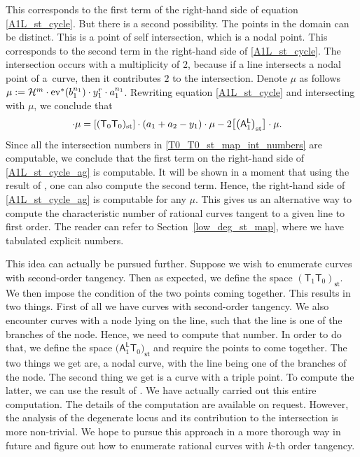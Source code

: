 \documentclass[pdftex]{sigma}
\numberwithin{equation}{section}
\begin{document}
This corresponds to the first term of the right-hand side of equation \eqref{A1L_st_cycle}.
But there is a second possibility. The points in the domain can be distinct. This is a point of self
intersection, which is a nodal point. This corresponds to the second term in the right-hand side of
\eqref{A1L_st_cycle}. The intersection occurs with a multiplicity of $2$, because
if a line intersects a nodal point of a~curve, then it contributes $2$ to the intersection.
Denote $\mu$ as follows
$
\mu := \mathcal{H}^{m}\cdot {\rm ev}^*(b_1^{n_1}) \cdot y_1^r \cdot a_1^{n_1}$.
Rewriting equation \eqref{A1L_st_cycle} and intersecting with $\mu$, we conclude that
\begin{align}
[(\mathsf{T}_1)_{\textsf{st}}]\cdot \mu & =
[(\mathsf{T}_0 \mathsf{T}_0)_{\textnormal{st}} ] \cdot (a_1+a_2-y_1) \cdot \mu-
2 \bigl[\bigl(\mathsf{A}_1^{\mathsf{L}}\bigr)_{\textnormal{st}}\bigr] \cdot \mu. \label{A1L_st_cycle_ag}
\end{align}
Since all the intersection numbers in \eqref{T0_T0_st_map_int_numbers} are computable,
we conclude that
the first term on the right-hand side of \eqref{A1L_st_cycle_ag} is computable.
It will be shown in a moment that using the result of \cite{AiM_m_fold_pt}, one can also compute the second term.
Hence, the right-hand side of \eqref{A1L_st_cycle_ag} is computable for any $\mu$.
This gives us an alternative way to compute the characteristic number of rational curves tangent to a given line to first order.
The reader can refer to Section~\ref{low_deg_st_map}, where we have tabulated explicit numbers.

This idea can actually be pursued further. Suppose we wish to enumerate curves with second-order tangency.
Then as expected, we define the space $(\mathsf{T}_1 \mathsf{T}_0)_{\mathsf{st}}$. We then impose the
condition of the two points coming together. This results in two things. First of all we have curves with second-order tangency. We also encounter curves with a node lying on the line, such that the line is one of the
branches of the node. Hence, we need to compute that number. In order to do that, we define the space
$\bigl(\mathsf{A}_1^{\mathsf{L}} \mathsf{T}_0\bigr)_{\mathsf{st}}$ and require the points to come together. The two things
we get are, a nodal curve, with the line being one of the branches of the node. The second thing we get is a curve
with a triple point. To compute the latter, we can use the result of \cite{AiM_m_fold_pt}. We have
actually carried out this entire computation. The details of the computation are available on request.
However, the analysis of the degenerate locus and its contribution to the intersection is more non-trivial.
We hope to pursue this approach in a more thorough way in future
and figure out how to enumerate rational curves with $k$-th order tangency.
\end{document}
